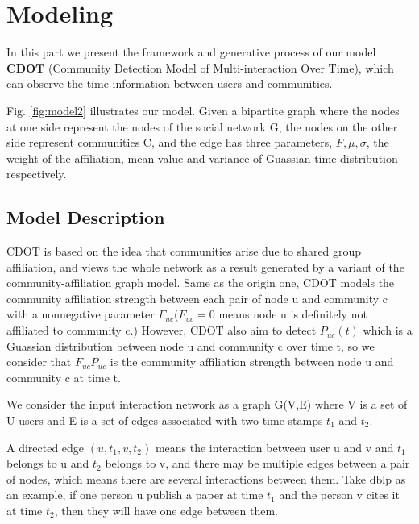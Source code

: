 \section{Modeling}
\label{sec:modeling}
In this part we present the framework and generative process of our model $\boldsymbol{CDOT}$ (Community Detection Model of Multi-interaction Over Time), which can observe the time information between users and communities.
\begin{figure*}[th]
	\centering
	\caption{Bipartite affiliation graph. Each user will connect communities with a weight like $F_{uA}$ and a Guassian distribution with mean value $\mu_{uA}$ and variance $\sigma_{uA}$. }
	\label{fig:model2}
\end{figure*}
Fig. \ref{fig:model2} illustrates our model. Given a bipartite graph where the nodes at one side represent the nodes of the social network G, the nodes on the other side represent communities C, and the edge has three parameters, $F, \mu, \sigma$, the weight of the affiliation, mean value and variance of Guassian time distribution respectively.

\subsection{Model Description}
\label{subsec:formulation}





CDOT is based on the idea that communities arise due to shared group affiliation, and views the whole network as a result generated by a variant of the community-affiliation graph model. Same as the origin one, CDOT models the community affiliation strength between each pair of node u and community c with a nonnegative parameter $F_{uc}$($F_{uc}=0$ means node u is definitely not affiliated to community c.) 
However, CDOT also aim to detect $P_{uc}(t)$ which is a Guassian distribution between node u and community c over time t, so we consider that $F_{uc} P_{uc}$ is the community affiliation strength between node u and community c at time t.

We consider the input interaction network as a graph G(V,E) where V is a set of U users and E is a set of edges associated with two time stamps $t_1$ and $t_2$.

A directed edge $(u,t_1,v,t_2)$ means the interaction between user u and v and $t_1$ belongs to u and $t_2$ belongs to v, and there may be multiple edges between a pair of nodes, which means there are several interactions between them. Take dblp as an example, if one person u publish a paper at time $t_1$ and the person v cites it at time $t_2$, then they will have one edge between them.

